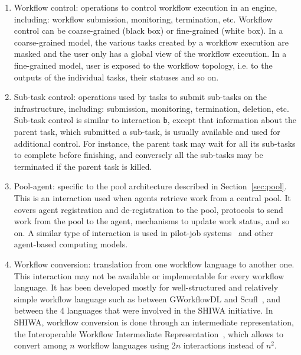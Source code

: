 \documentclass[preprint,3p,twocolumn]{elsarticle}
\begin{document}
\begin{enumerate}[leftmargin=0cm,itemindent=0.65cm,label=\texttt{(\alph*)}]
{    And I clearly see now that this is in fact the case in III, c is not differentiated. Closing this thread for good.}
  Tools and services such as JSAGA~\cite{reynaud2010uniform} or Data Avenue~\cite{hajnal2014data}
  can be used to homogeneize these interfaces.
\item Workflow control: operations to control workflow execution in an
  engine, including: workflow submission, monitoring, termination,
  etc. Workflow control can be coarse-grained (black box) or
  fine-grained (white box). In a coarse-grained model, the various
  tasks created by a workflow execution are masked and the user only
  has a global view of the workflow execution. In a fine-grained
  model, user is exposed to the workflow topology, i.e. to the outputs
  of the individual tasks, their statuses and so on.
\item Sub-task control: operations used by tasks to submit sub-tasks
  on the infrastructure, including: submission, monitoring,
  termination, deletion, etc. Sub-task control is similar to
  interaction \texttt{b}, except that information about the parent
  task, which submitted a sub-task, is usually available and used for
  additional control. For instance, the parent task may wait for all
  its sub-tasks to complete before finishing, and conversely all the
  sub-tasks may be terminated if the parent task is killed.
\item Pool-agent: specific to the pool architecture described in
  Section~\ref{sec:pool}. This is an interaction used when agents
  retrieve work from a central pool. It covers agent registration and
  de-registration to the pool, protocols to send work from the pool to
  the agent, mechanisms to update work status, and so on. A similar
  type of interaction is used in pilot-job
  systems~\cite{turilli2015comprehensive} and other agent-based
  computing models.
\item Workflow conversion: translation from one workflow language to
  another one. This interaction may not be available or implementable
  for every workflow language. It has been developed mostly for
  well-structured and relatively simple workflow language such as between GWorkflowDL
  and Scufl~\cite{OLAB-09}, and between the 4 languages that were involved in the
  SHIWA initiative. In SHIWA, workflow conversion is done through an
  intermediate representation, the Interoperable Workflow Intermediate
  Representation~\cite{plankensteiner-montagnat-etal:2011}, which
  allows to convert among $n$ workflow languages using $2n$
  interactions instead of $n^2$.
\end{enumerate}
\end{document}
